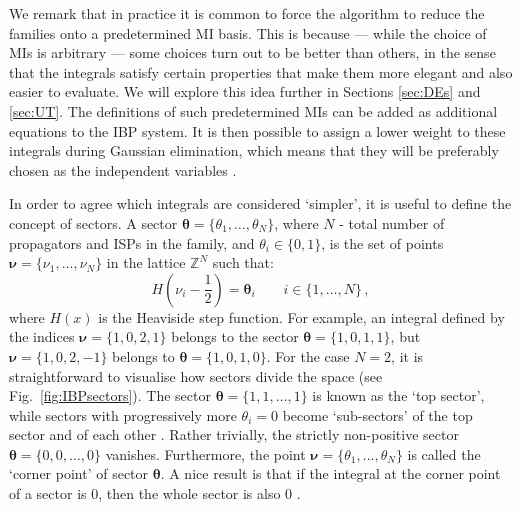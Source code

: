 \documentclass[main.tex]{subfiles}
\begin{document}
We remark that in practice it is common to force the algorithm to reduce the families onto a predetermined MI basis. This is because --- while the choice of MIs is arbitrary --- some choices turn out to be better than others, in the sense that the integrals satisfy certain properties that make them more elegant and also easier to evaluate. We will explore this idea further in Sections \ref{sec:DEs} and \ref{sec:UT}. The definitions of such predetermined MIs can be added as additional equations to the IBP system. It is then possible to assign a lower weight to these integrals during Gaussian elimination, which means that they will be preferably chosen as the independent variables \cite{Peraro:2019svx}.

In order to agree which integrals are considered `simpler', it is useful to define the concept of sectors. A sector $\bm{\theta} = \{\theta_1, \ldots, \theta_N\}$, where $N$ - total number of propagators and ISPs in the family, and $\theta_i\in \{0, 1\}$, is the set of points $\bm{\nu} = \{\nu_1, \ldots, \nu_N\}$ in the lattice $\mathbb{Z}^N$ such that:
\begin{equation} \label{eq:sectors}
    H \left(\nu_i - \frac{1}{2} \right) = \mathbf{\theta}_i \qquad i \in \{1, \ldots, N\} \,,
\end{equation}
where $H(x)$ is the Heaviside step function. For example, an integral defined by the indices $\bm{\nu} = \{1, 0, 2, 1\}$ belongs to the sector $\bm{\theta} = \{1, 0, 1, 1\}$, but $\bm{\nu} = \{1, 0, 2, -1\}$ belongs to $\bm{\theta} = \{1, 0, 1, 0\}$. For the case $N=2$, it is straightforward to visualise how sectors divide the space (see Fig.~\ref{fig:IBPsectors}). The sector $\bm{\theta} = \{1, 1, \ldots, 1\}$ is known as the `top sector', while sectors with progressively more $\theta_i = 0$ become `sub-sectors' of the top sector and of each other . Rather trivially, the strictly non-positive sector $\bm{\theta} = \{0, 0, \ldots, 0\}$ vanishes. Furthermore, the point $\bm{\nu} = \{\theta_1, \ldots, \theta_N\}$ is called the `corner point' of sector $\bm{\theta}$. A nice result is that if the integral at the corner point of a sector is 0, then the whole sector is also 0 \cite{Lee:2008tj}.
\end{document}
